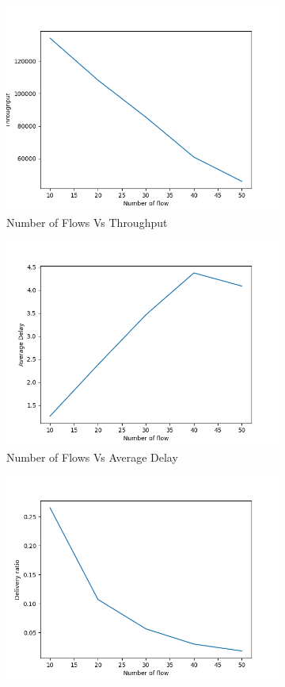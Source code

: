\begin{figure}[h]
\begin{subfigure}{.5\textwidth}
  \centering
  \includegraphics[width=.8\linewidth]{_11_2_mobile/NumberofFlowvsThroughput.png}
     \caption{Number of Flows Vs Throughput}
    \label{flow_throughput_mobile}
\end{subfigure}
\begin{subfigure}{.5\textwidth}
  \centering
  \includegraphics[width=.8\linewidth]{_11_2_mobile/NumberofFlowvsAverageDelay.png}
    \caption{Number of Flows Vs Average Delay}
     \label{flow_delay_mobile}
\end{subfigure}
\begin{subfigure}{.5\textwidth}
  \centering
  \includegraphics[width=.8\linewidth]{_11_2_mobile/NumberofFlowvsDeliveryRatio.png}

\end{subfigure}
\end{figure}
